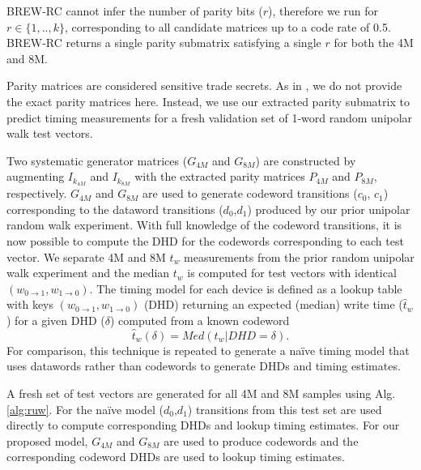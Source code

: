 \label{sec:results}

BREW-RC cannot infer the number of parity bits ($r$), therefore we run for $r \in \{1,..,k\}$, corresponding to all candidate matrices up to a code rate of 0.5. BREW-RC returns a single parity submatrix satisfying a single $r$ for both the 4M and 8M. 

Parity matrices are considered sensitive trade secrets. As in \cite{patel2020bit}, we do not provide the exact parity matrices here. Instead, we use our extracted parity submatrix to predict timing measurements for a fresh validation set of 1-word random unipolar walk test vectors.  


Two systematic generator matrices ($G_{4M}$ and $G_{8M}$) are constructed by augmenting $I_{k_{4M}}$ and $I_{k_{8M}}$ with the extracted parity matrices $P_{4M}$ and $P_{8M}$, respectively. $G_{4M}$ and $G_{8M}$ are used to generate codeword transitions ($c_0$, $c_1$) corresponding to the dataword transitions  ($d_0$,$d_1$) produced by our prior unipolar random walk experiment. With full knowledge of the codeword transitions, it is now possible to compute the DHD for the codewords corresponding to each test vector. We separate 4M and 8M $t_w$ measurements from the prior random unipolar walk experiment and the median $t_w$ is computed for test vectors with identical $\left( w_{0\to1}, w_{1\to0} \right)$. The timing model for each device is defined as a lookup table with keys $\left( w_{0\to1}, w_{1\to0} \right)$ (DHD) returning an expected (median) write time ($\hat{t}_w$) for a given DHD ($\delta$) computed from a known codeword
{
\setlength{\abovedisplayskip}{2pt}
\setlength{\belowdisplayskip}{2pt}
\begin{equation}
    \hat{t}_w\left( \delta\right) = Med\left( t_w | DHD=\delta\right). 
\end{equation}
}
For comparison, this technique is repeated to generate a na\"ive timing model that uses datawords rather than codewords to generate DHDs and timing estimates. 



A fresh set of test vectors are generated for all 4M and 8M samples using Alg. \ref{alg:ruw}. For the na\"ive model ($d_0$,$d_1$) transitions from this test set are used directly to compute corresponding DHDs and lookup timing estimates. For our proposed model, $G_{4M}$ and $G_{8M}$ are used to produce codewords and the corresponding codeword DHDs are used to lookup timing estimates.

